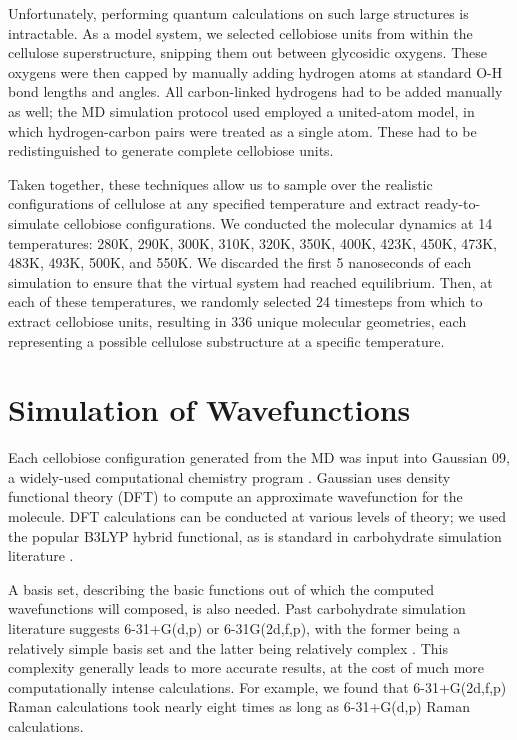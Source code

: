 Unfortunately, performing quantum calculations on such large structures is intractable. As a model system, we selected cellobiose units from within the cellulose superstructure, snipping them out between glycosidic oxygens. These oxygens were then capped by manually adding hydrogen atoms at standard O-H bond lengths and angles. All carbon-linked hydrogens had to be added manually as well; the MD simulation protocol used employed a united-atom model, in which hydrogen-carbon pairs were treated as a single atom. These had to be redistinguished to generate complete cellobiose units.

Taken together, these techniques allow us to sample over the realistic configurations of cellulose at any specified temperature and extract ready-to-simulate cellobiose configurations. We conducted the molecular dynamics at 14 temperatures: 280K, 290K, 300K, 310K, 320K, 350K, 400K, 423K, 450K, 473K, 483K, 493K, 500K, and 550K. We discarded the first 5 nanoseconds of each simulation to ensure that the virtual system had reached equilibrium. Then, at each of these temperatures, we randomly selected 24 timesteps from which to extract cellobiose units, resulting in 336 unique molecular geometries, each representing a possible cellulose substructure at a specific temperature.

\section{Simulation of Wavefunctions}

Each cellobiose configuration generated from the MD was input into Gaussian 09, a widely-used computational chemistry program \cite{RefWorks:26}. Gaussian uses density functional theory (DFT) \cite{RefWorks:44} to compute an approximate wavefunction for the molecule. DFT calculations can be conducted at various levels of theory; we used the popular B3LYP hybrid functional, as is standard in carbohydrate simulation literature \cite{RefWorks:46,RefWorks:34}.

A basis set, describing the basic functions out of which the computed wavefunctions will composed, is also needed. Past carbohydrate simulation literature suggests 6-31+G(d,p) or 6-31G(2d,f,p), with the former being a relatively simple basis set and the latter being relatively complex \cite{RefWorks:34}. This complexity generally leads to more accurate results, at the cost of much more computationally intense calculations. For example, we found that 6-31+G(2d,f,p) Raman calculations took nearly eight times as long as 6-31+G(d,p) Raman calculations.

